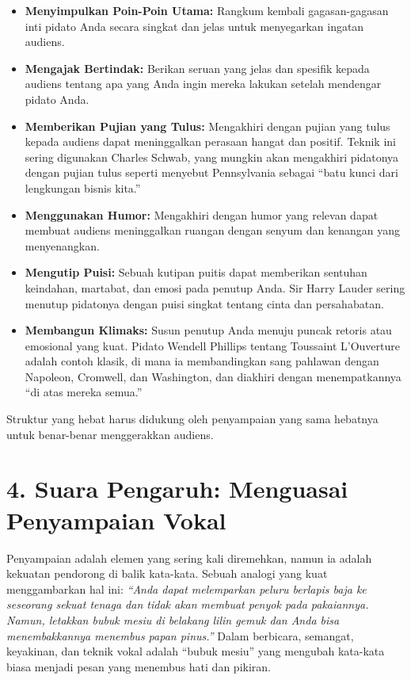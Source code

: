 \documentclass[
  letterpaper,
  DIV=11,
  numbers=noendperiod]{scrreprt}
\begin{document}
\begin{itemize}
\item
  \textbf{Menyimpulkan Poin-Poin Utama:} Rangkum kembali gagasan-gagasan
  inti pidato Anda secara singkat dan jelas untuk menyegarkan ingatan
  audiens.
\item
  \textbf{Mengajak Bertindak:} Berikan seruan yang jelas dan spesifik
  kepada audiens tentang apa yang Anda ingin mereka lakukan setelah
  mendengar pidato Anda.
\item
  \textbf{Memberikan Pujian yang Tulus:} Mengakhiri dengan pujian yang
  tulus kepada audiens dapat meninggalkan perasaan hangat dan positif.
  Teknik ini sering digunakan Charles Schwab, yang mungkin akan
  mengakhiri pidatonya dengan pujian tulus seperti menyebut Pennsylvania
  sebagai ``batu kunci dari lengkungan bisnis kita.''
\item
  \textbf{Menggunakan Humor:} Mengakhiri dengan humor yang relevan dapat
  membuat audiens meninggalkan ruangan dengan senyum dan kenangan yang
  menyenangkan.
\item
  \textbf{Mengutip Puisi:} Sebuah kutipan puitis dapat memberikan
  sentuhan keindahan, martabat, dan emosi pada penutup Anda. Sir Harry
  Lauder sering menutup pidatonya dengan puisi singkat tentang cinta dan
  persahabatan.
\item
  \textbf{Membangun Klimaks:} Susun penutup Anda menuju puncak retoris
  atau emosional yang kuat. Pidato Wendell Phillips tentang Toussaint
  L'Ouverture adalah contoh klasik, di mana ia membandingkan sang
  pahlawan dengan Napoleon, Cromwell, dan Washington, dan diakhiri
  dengan menempatkannya ``di atas mereka semua.''
\end{itemize}

Struktur yang hebat harus didukung oleh penyampaian yang sama hebatnya
untuk benar-benar menggerakkan audiens.


\chapter{4. Suara Pengaruh: Menguasai Penyampaian
Vokal}\label{suara-pengaruh-menguasai-penyampaian-vokal}

Penyampaian adalah elemen yang sering kali diremehkan, namun ia adalah
kekuatan pendorong di balik kata-kata. Sebuah analogi yang kuat
menggambarkan hal ini: \emph{``Anda dapat melemparkan peluru berlapis
baja ke seseorang sekuat tenaga dan tidak akan membuat penyok pada
pakaiannya. Namun, letakkan bubuk mesiu di belakang lilin gemuk dan Anda
bisa menembakkannya menembus papan pinus.''} Dalam berbicara, semangat,
keyakinan, dan teknik vokal adalah ``bubuk mesiu'' yang mengubah
kata-kata biasa menjadi pesan yang menembus hati dan pikiran.
\end{document}
